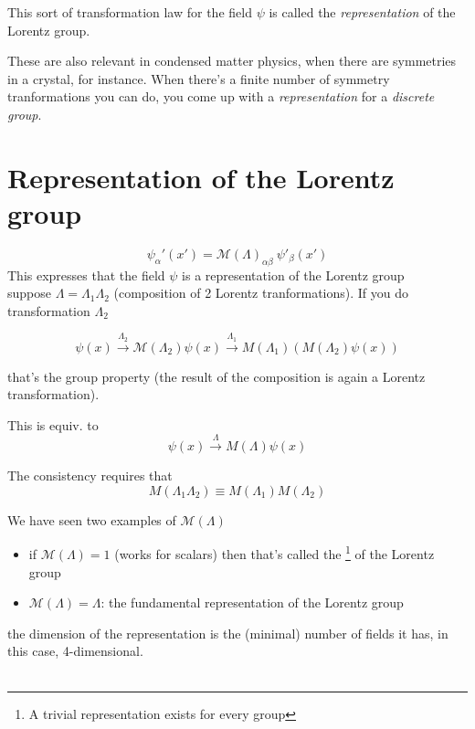 \documentclass[11pt]{article}
\begin{document}
	This sort of transformation law for the field $\psi$ is called the \textit{representation} of the Lorentz group.
	
	These are also relevant in condensed matter physics, when there are symmetries in a crystal, for instance. When there's a finite number of symmetry tranformations you can do, you come up with a \textit{representation} for a \textit{discrete group}.
	
	\section*{Representation of the Lorentz group}
	
	\[ \psi_\alpha '(x') = \mathcal{M}(\Lambda)_{\alpha\beta}\ \psi'_\beta (x')\]
  This expresses that the field $\psi$ is a representation of the Lorentz group\\
  
	suppose $\Lambda = \Lambda_1 \Lambda_2$ (composition of 2 Lorentz tranformations). If you do transformation $\Lambda_2$
	
	\[ \psi(x) \xrightarrow{\Lambda_2} \mathcal{M} (\Lambda_2) \psi(x) \xrightarrow{\Lambda_1} M(\Lambda_1) (M(\Lambda_2)\psi(x))\]
	
	that's the group property (the result of the composition is again a Lorentz transformation).
	
	This is equiv. to 
	\[ \psi(x) \xrightarrow{\Lambda} M(\Lambda) \psi(x)\]
	
	The consistency requires that \[ M(\Lambda_1\Lambda_2) \equiv M(\Lambda_1) M(\Lambda_2)\]


	We have seen two examples of $\mathcal{M}(\Lambda)$ 
	
	\begin{itemize}
			\item if $\mathcal{M}(\Lambda) = 1$ (works for scalars) then that's called the \footnote{A trivial representation exists for every group} of the Lorentz group
			
			\item $\mathcal{M}(\Lambda) = \Lambda$: the fundamental representation of the Lorentz group
			
	\end{itemize}

	the dimension of the representation is the (minimal) number of fields it has, in this case, 4-dimensional.\\
	
	\\
	
\end{document}
